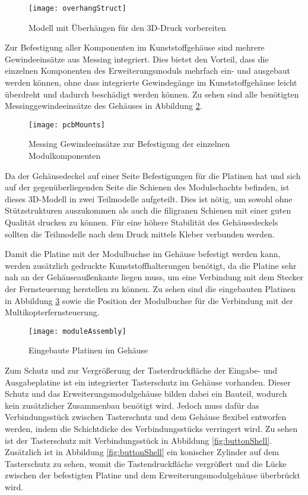 \begin{figure}[h]
    \centering
    \texttt{[image: overhangStruct]}
    \caption{Modell mit Überhängen für den 3D-Druck vorbereiten}
    \label{fig:overhangStruct}
\end{figure}

Zur Befestigung aller Komponenten im Kunststoffgehäuse sind mehrere Gewindeeinsätze aus Messing integriert. Dies bietet den Vorteil, dass die einzelnen Komponenten des Erweiterungsmoduls mehrfach ein- und ausgebaut werden können, ohne dass integrierte Gewindegänge im Kunststoffgehäuse leicht überdreht und dadurch beschädigt werden können. Zu sehen sind alle benötigten Messinggewindeeinsätze des Gehäuses in Abbildung \ref{fig:pcbMounts}.

\begin{figure}[h]
    \centering
    \texttt{[image: pcbMounts]}
    \caption{Messing Gewindeeinsätze zur Befestigung der einzelnen Modulkomponenten}
    \label{fig:pcbMounts}
\end{figure}

Da der Gehäusedeckel auf einer Seite Befestigungen für die Platinen hat und sich auf der gegenüberliegenden Seite die Schienen des Modulschachts befinden, ist dieses 3D-Modell in zwei Teilmodelle aufgeteilt. Dies ist nötig, um sowohl ohne Stützstrukturen auszukommen als auch die filigranen Schienen mit einer guten Qualität drucken zu können. Für eine höhere Stabilität des Gehäusedeckels sollten die Teilmodelle nach dem Druck mittels Kleber verbunden werden.

Damit die Platine mit der Modulbuchse im Gehäuse befestigt werden kann, werden zusätzlich gedruckte Kunststoffhalterungen benötigt, da die Platine sehr nah an der Gehäuseaußenkante liegen muss, um eine Verbindung mit dem Stecker der Fernsteuerung herstellen zu können. Zu sehen sind die eingebauten Platinen in Abbildung \ref{fig:moduleAssembly} sowie die Position der Modulbuchse für die Verbindung mit der Multikopterfernsteuerung.

\begin{figure}[h]
    \centering
    \texttt{[image: moduleAssembly]}
    \caption{Eingebaute Platinen im Gehäuse}
    \label{fig:moduleAssembly}
\end{figure}

Zum Schutz und zur Vergrößerung der Tasterdruckfläche der Eingabe- und Ausgabeplatine ist ein integrierter Tasterschutz im Gehäuse vorhanden. Dieser Schutz und das Erweiterungsmodulgehäuse bilden dabei ein Bauteil, wodurch kein zusätzlicher Zusammenbau benötigt wird. Jedoch muss dafür das Verbindungsstück zwischen Tasterschutz und dem Gehäuse flexibel entworfen werden, indem die Schichtdicke des Verbindungsstücks verringert wird. Zu sehen ist der Tasterschutz mit Verbindungsstück in Abbildung \ref{fig:buttonShell}. Zusätzlich ist in Abbildung \ref{fig:buttonShell} ein konischer Zylinder auf dem Tasterschutz zu sehen, womit die Tastendruckfläche vergrößert und die Lücke zwischen der befestigten Platine und dem Erweiterungsmodulgehäuse überbrückt wird.

